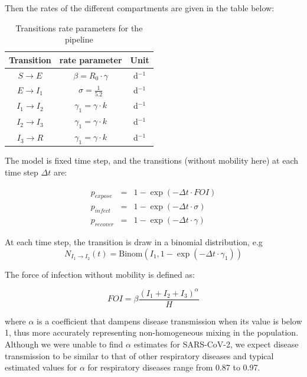 Then the rates of the different compartments are given in the table below:
\begin{table}
    \centering
    \begin{tabular}{ccc}
\toprule
Transition & rate parameter &Unit \\
 \midrule
$S\longrightarrow E$  &   $\beta = R_0 \cdot \gamma$  & d$^{-1}$\\
$E\longrightarrow I_1$ & $\sigma = \frac{1}{5.2}$         & d$^{-1}$\\
$I_1\longrightarrow I_2$ & $\gamma_1 = \gamma \cdot k$ & d$^{-1}$\\
$I_2\longrightarrow I_3$ & $\gamma_1 = \gamma \cdot k$ & d$^{-1}$\\
$I_3\longrightarrow R$ & $\gamma_1 = \gamma \cdot k$&d$^{-1}$\\
\bottomrule
\end{tabular}
\caption{Transitions rate parameters for the pipeline}
     \label{tab:survpars}
\end{table}


The model is fixed time step, and the transitions (without mobility here) at each time step
$\Delta t$ are: 

\begin{eqnarray}
p_{expose} &=&  1 - \exp(-\Delta t \cdot FOI) \\
p_{infect} &=& 1 - \exp(-\Delta t \cdot \sigma)\\
p_{recover} &=& 1 - \exp(-\Delta t \cdot \gamma)
\end{eqnarray}

At each time step, the transition is draw in a binomial distribution, e.g 
\begin{equation}
N_{I_1\longrightarrow I_2}(t) = \text{Binom}(I_1, 1 - \exp(-\Delta t \cdot \gamma_1))
\end{equation}

The force of infection without mobility is defined as: 

\begin{equation}
FOI = \beta \frac{(I_1 + I_2 + I_3)^\alpha}{H} 
\end{equation}

where $\alpha$ is a coefficient that dampens disease transmission when its value is below 1, thus more accurately representing non-homogeneous mixing in the population. Although we were unable to find $\alpha$ estimates for SARS-CoV-2, we expect disease transmission to be similar to that of other respiratory diseases and typical estimated values for $\alpha$ for respiratory diseases range from 0.87 to 0.97.

